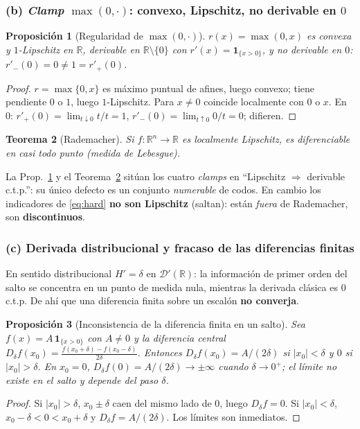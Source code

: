 \documentclass[11pt,a4paper]{article}
\theoremstyle{plain}
\newtheorem{theorem}{Teorema}
\newtheorem{proposition}[theorem]{Proposici\'on}
\theoremstyle{definition}
\newcommand{\R}{\mathbb{R}}
\newcommand{\abs}[1]{\left\lvert #1 \right\rvert}
\begin{document}
\subsubsection*{(b) \emph{Clamp} $\max(0,\cdot)$: convexo, Lipschitz, no derivable en $0$}

\begin{proposition}[Regularidad de $\max(0,\cdot)$]\label{prop:relu}
$r(x)=\max(0,x)$ es convexa y $1$-Lipschitz en $\R$, derivable en
$\R\setminus\{0\}$ con $r'(x)=\mathbf{1}_{\{x>0\}}$, y \emph{no} derivable en $0$:
$r'_-(0)=0\neq1=r'_+(0)$.
\end{proposition}
\begin{proof}
$r=\max\{0,x\}$ es m\'aximo puntual de afines, luego convexo; tiene pendiente $0$
o $1$, luego $1$-Lipschitz. Para $x\neq0$ coincide localmente con $0$ o $x$. En
$0$: $r'_+(0)=\lim_{t\downarrow0}t/t=1$, $r'_-(0)=\lim_{t\uparrow0}0/t=0$; difieren.
\end{proof}

\begin{theorem}[Rademacher]\label{thm:rademacher}
Si $f:\R^n\to\R$ es localmente Lipschitz, es diferenciable en casi todo punto
(medida de Lebesgue).
\end{theorem}

La Prop.~\ref{prop:relu} y el Teorema~\ref{thm:rademacher} sit\'uan los cuatro
\emph{clamps} en ``Lipschitz $\Rightarrow$ derivable c.t.p.'': su \'unico defecto
es un conjunto \emph{numerable} de codos. En cambio los indicadores de
\eqref{eq:hard} \textbf{no son Lipschitz} (saltan): est\'an \emph{fuera} de
Rademacher, son \textbf{discontinuos}.

\subsubsection*{(c) Derivada distribucional y fracaso de las diferencias finitas}

En sentido distribucional $H'=\delta$ en $\mathcal{D}'(\R)$: la informaci\'on de
primer orden del salto se concentra en un punto de medida nula, mientras la
derivada cl\'asica es $0$ c.t.p. De ah\'i que una diferencia finita sobre un
escal\'on \textbf{no converja}.

\begin{proposition}[Inconsistencia de la diferencia finita en un salto]\label{prop:fd}
Sea $f(x)=A\,\mathbf{1}_{\{x>0\}}$ con $A\neq0$ y la diferencia central
$D_\delta f(x_0)=\frac{f(x_0+\delta)-f(x_0-\delta)}{2\delta}$. Entonces
$D_\delta f(x_0)=A/(2\delta)$ si $\abs{x_0}<\delta$ y $0$ si $\abs{x_0}>\delta$.
En $x_0=0$, $D_\delta f(0)=A/(2\delta)\to\pm\infty$ cuando $\delta\to0^+$; el
l\'imite no existe en el salto y \emph{depende del paso} $\delta$.
\end{proposition}
\begin{proof}
Si $\abs{x_0}>\delta$, $x_0\pm\delta$ caen del mismo lado de $0$, luego
$D_\delta f=0$. Si $\abs{x_0}<\delta$, $x_0-\delta<0<x_0+\delta$ y
$D_\delta f=A/(2\delta)$. Los l\'imites son inmediatos.
\end{proof}
\end{document}
